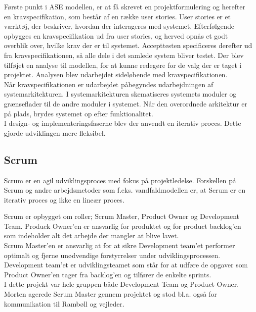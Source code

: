Første punkt i ASE modellen, er at få skrevet en projektformulering og herefter en kravspecifikation, som består af en række user stories. User stories er et værktøj, der beskriver, hvordan der interageres med systemet. Efterfølgende opbygges en kravspecifikation ud fra user stories, og herved opnås et godt overblik over, hvilke krav der er til systemet. Accepttesten specificeres derefter ud fra kravspecifikationen, så alle dele i det samlede system bliver testet.
Der blev tilføjet en analyse til modellen, for at kunne redegøre for de valg der er taget i projektet. Analysen blev udarbejdet sideløbende med kravspecifikationen. \\
Når kravspecifikationen er udarbejdet påbegyndes udarbejdningen af systemarkitekturen. I systemarkitekturen skematiseres systemets moduler og grænseflader til de andre moduler i systemet. Når den overordnede arkitektur er på plads, brydes systemet op efter funktionalitet. \\
I design- og implementeringsfaserne blev der anvendt en iterativ proces. Dette gjorde udviklingen mere fleksibel. \\

\subsection{Scrum}
Scrum \cite{Scrum} er en agil udviklingsproces med fokus på projektledelse. Forskellen på Scrum og andre arbejdsmetoder som f.eks. vandfaldmodellen\cite{Vandfald} er, at Scrum er en iterativ proces og ikke en lineær proces.

Scrum er opbygget om roller; Scrum Master, Product Owner og Development Team. Produck Owner'en er ansvarlig for produktet og for product backlog'en som indeholder alt det arbejde der mangler at blive lavet. \\
Scrum Master'en er ansvarlig at for at sikre Development team'et performer optimalt og fjerne unødvendige forstyrrelser under udviklingsprocessen. \\
Development team'et er udviklingsteamet som står for at udføre de opgaver som Product Owner'en tager fra backlog'en og tilfører de enkelte sprints. \\
I dette projekt var hele gruppen både Development Team og Product Owner. Morten agerede Scrum Master gennem projektet og stod bl.a. også for kommunikation til Rambøll og vejleder.



